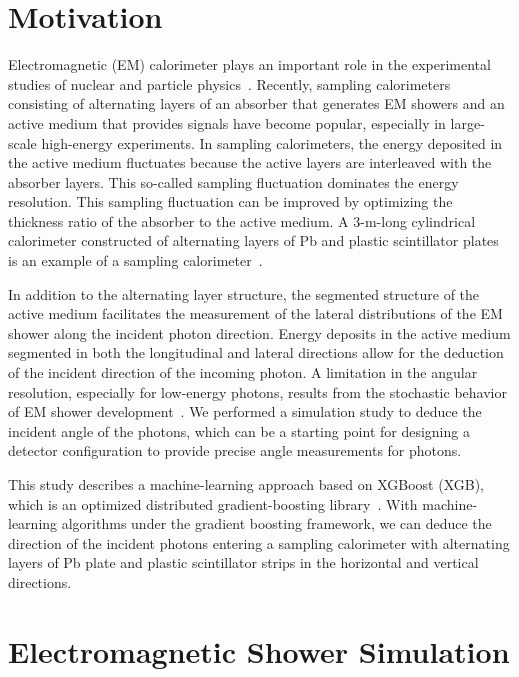 \documentclass[preprint,12pt,times,a4paper]{elsarticle}
\begin{document}
\section{Motivation}
\label{sec:mot}
Electromagnetic (EM) calorimeter plays an important role in the experimental studies of nuclear and particle physics~\cite{KOTO:MB, CMS:EMCAL, BELLE:EMCAL}. Recently, sampling calorimeters consisting of alternating layers of an absorber that generates EM showers and an active medium that provides signals have become popular, especially in large-scale high-energy experiments. In sampling calorimeters, the energy deposited in the active medium fluctuates because the active layers are interleaved with the absorber layers. This so-called sampling fluctuation dominates the energy resolution. This sampling fluctuation can be improved by optimizing the thickness ratio of the absorber to the active medium. A 3-m-long cylindrical calorimeter constructed of alternating layers of Pb and plastic scintillator plates is an example of a sampling calorimeter~\cite{Murayama:2020mcp}.

In addition to the alternating layer structure, the segmented structure of the active medium facilitates the measurement of the lateral distributions of the EM shower along the incident photon direction. Energy deposits in the active medium segmented in both the longitudinal and lateral directions allow for the deduction of the incident direction of the incoming photon. A limitation in the angular resolution, especially for low-energy photons, results from the stochastic behavior of EM shower development~\cite{trk:ref}. We performed a simulation study to deduce the incident angle of the photons, which can be a starting point for designing a detector configuration to provide precise angle measurements for photons.

This study describes a machine-learning approach based on XGBoost (XGB), which is an optimized distributed gradient-boosting library~\cite{xgboost:2016}. With machine-learning algorithms under the gradient boosting framework, we can deduce the direction of the incident photons entering a sampling calorimeter with alternating layers of Pb plate and plastic scintillator strips in the horizontal and vertical directions.

\section{Electromagnetic Shower Simulation}
\label{sec:ems}
\end{document}
